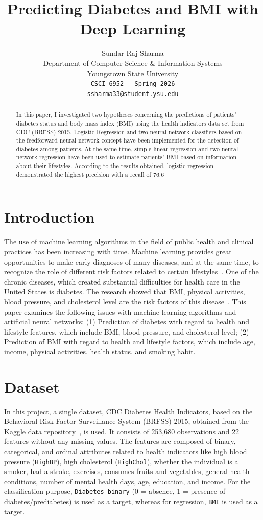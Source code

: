 \documentclass{article}
\title{Predicting Diabetes and BMI with Deep Learning}
\author{%
  Sundar Raj Sharma \\
  Department of Computer Science \& Information Systems \\
  Youngstown State University \\
  \texttt{CSCI 6952 -- Spring 2026} \\
  \texttt{ssharma33@student.ysu.edu} \\
}
\begin{document}
\maketitle

\begin{abstract}
In this paper, I investigated two hypotheses concerning the predictions of patients’ diabetes status and body mass index (BMI) using the health indicators data set from CDC (BRFSS) 2015. Logistic Regression and two neural network classifiers based on the feedforward neural network concept have been implemented for the detection of diabetes among patients. At the same time, simple linear regression and two neural network regression have been used to estimate patients’ BMI based on information about their lifestyles. According to the results obtained, logistic regression demonstrated the highest precision with a recall of 76.6


\end{abstract}

\section{Introduction}

The use of machine learning algorithms in the field of public health and clinical practices has been increasing with time. Machine learning provides great opportunities to make early diagnoses of many diseases, and at the same time, to recognize the role of different risk factors related to certain lifestyles~\cite{xie2019}. One of the chronic diseases, which created substantial difficulties for health care in the United States is diabetes. The research showed that BMI, physical activities, blood pressure, and cholesterol level are the risk factors of this disease~\cite{brfss2015dataset}. This paper examines the following issues with machine learning algorithms and artificial neural networks: 
(1) Prediction of diabetes with regard to health and lifestyle features, which include BMI, blood pressure, and cholesterol level; 
(2) Prediction of BMI with regard to health and lifestyle factors, which include age, income, physical activities, health status, and smoking habit.

\section{Dataset}

In this project, a single dataset, CDC Diabetes Health Indicators, based on the Behavioral Risk Factor Surveillance System (BRFSS) 2015, obtained from the Kaggle data repository~\cite{brfss2015dataset}, is used. It consists of 253,680 observations and 22 features without any missing values. The features are composed of binary, categorical, and ordinal attributes related to health indicators like high blood pressure (\texttt{HighBP}), high cholesterol (\texttt{HighChol}), whether the individual is a smoker, had a stroke, exercises, consumes fruits and vegetables, general health conditions, number of mental health days, age, education, and income. For the classification purpose, \texttt{Diabetes\_binary} (0 = absence, 1 = presence of diabetes/prediabetes) is used as a target, whereas for regression, \texttt{BMI} is used as a target.
\end{document}
